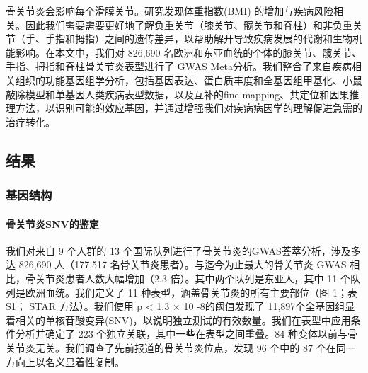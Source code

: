 骨关节炎会影响每个滑膜关节。研究发现体重指数(BMI)
的增加与疾病风险相关。因此我们需要需要更好地了解负重关节（膝关节、髋关节和脊柱）和非负重关节（手、手指和拇指）之间的遗传差异，以帮助解开导致疾病发展的代谢和生物机能影响。在本文中，我们对
826,690
名欧洲和东亚血统的个体的膝关节、髋关节、手指、拇指和脊柱骨关节炎表型进行了
GWAS
Meta分析。我们整合了来自疾病相关组织的功能基因组学分析，包括基因表达、蛋白质丰度和全基因组甲基化、小鼠敲除模型和单基因人类疾病表型数据，以及互补的fine-mapping、共定位和因果推理方法，以识别可能的效应基因，并通过增强我们对疾病病因学的理解促进急需的治疗转化。


\subsection*{结果}


\subsubsection*{基因结构}

\paragraph*{骨关节炎SNV的鉴定}

我们对来自 9 个人群的 13
个国际队列进行了骨关节炎的GWAS荟萃分析，涉及多达 826,690 人（177,517
名骨关节炎患者）。与迄今为止最大的骨关节炎 GWAS
相比，骨关节炎患者人数大幅增加（2.3 倍）。其中两个队列是东亚人，其中 11
个队列是欧洲血统。我们定义了 11 种表型，涵盖骨关节炎的所有主要部位（图
1；表 S1； STAR 方法）。我们使用 p \textless{} 1.3 × 10 -8的阈值发现了
11,897个全基因组显着相关的单核苷酸变异(SNV)，以说明独立测试的有效数量。我们在表型中应用条件分析并确定了
223 个独立关联，其中一些在表型之间重叠。84
种变体以前与骨关节炎无关。我们调查了先前报道的骨关节炎位点，发现 96
个中的 87 个在同一方向上以名义显着性复制。

